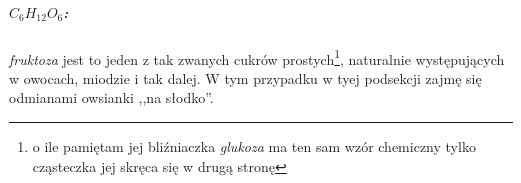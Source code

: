 \documentclass[./KNIGA.tex]{subfiles}
\begin{document}
\subparagraph{$C_6H_{12}O_6$:}
\emph{fruktoza} jest to jeden z tak zwanych cukrów prostych\footnote{o ile pamiętam jej bliźniaczka \emph{glukoza} ma ten sam wzór chemiczny tylko cząsteczka jej skręca się w drugą stronę}, naturalnie występujących w owocach, miodzie i tak dalej. W tym przypadku w tyej podsekcji zajmę się odmianami owsianki ,,na słodko''.
\end{document}
